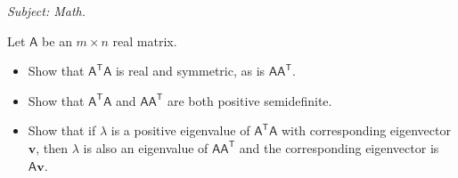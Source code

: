 \documentclass{integrated_core_problems}
\begin{document}
\begin{problem}
\label{prob:eigenvalues_of_ATA}

\noindent \textit{Subject: Math.}

\noindent Let $\mathsf{A}$ be an $m\times n$ real matrix.

\begin{itemize}
    \item[a)] Show that $\mathsf{A}^\mathsf{T}\mathsf{A}$ is real and symmetric, as is $\mathsf{A}\mathsf{A}^\mathsf{T}$.
    \item[b)] Show that $\mathsf{A}^\mathsf{T}\mathsf{A}$ and $\mathsf{A}\mathsf{A}^\mathsf{T}$ are both positive semidefinite. 
    \item[c)] Show that if $\lambda$ is a positive eigenvalue of $\mathsf{A}^\mathsf{T}\mathsf{A}$ with corresponding eigenvector $\mathbf{v}$, then $\lambda$ is also an eigenvalue of $\mathsf{A}\mathsf{A}^\mathsf{T}$ and the corresponding eigenvector is $\mathsf{A}\mathbf{v}$.
\end{itemize}

\end{problem}
\end{document}
